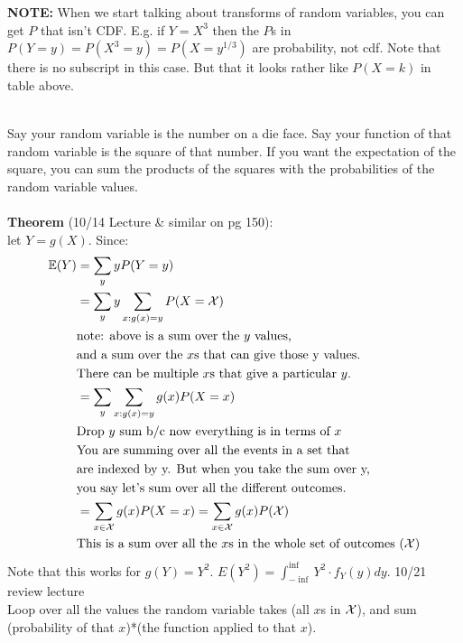 \textbf{NOTE:}  When we start talking about transforms of random variables, you can get $P$ that isn't CDF.  E.g. if $Y = X^3$ then the $P$s in $P(Y = y) = P(X^3 = y) = P(X = y^{1/3}) $ are probability, not cdf.  Note that there is no subscript in this case.  But that it looks rather like $P(X=k)$ in table above.   %

\hfill \\
Say your random variable is the number on a die face.  Say your function of that random variable is the square of that number.  If you want the expectation of the square, you can sum the products of the squares with the probabilities of the random variable values.  \hfill \\
\hfill \\
\textbf{Theorem} {\tiny (10/14 Lecture \& similar on pg 150)}:  \hfill \\
let $Y = g(X)$.  Since:
	\begin{align*}
		\mathbb{E} (Y) &=  \sum\limits_{y} yP(Y=y)   \\
			& = \sum\limits_{y} y \sum\limits_{x:g(x)=y} P(X = {\cal X})  \\
			& \mbox{note: above is a sum over the $y$ values,} \\ 
			& \mbox{and a sum over the $x$s that can give those y values.} \\
			& \mbox{There can be multiple $x$s that give a particular $y$.} \\
			& = \sum\limits_{y} \sum\limits_{x:g(x)=y} g(x)P(X=x) \\
			& \mbox{Drop $y$ sum b/c now everything is in terms of $x$} \\
			& \mbox{You are summing over all the events in a set that }   \\
			& \mbox{are indexed by y.  But when you take the sum over y, }  \\
			& \mbox{you say let's sum over all the different outcomes. } \\
			& = \sum\limits_{x \in {\cal X}} g(x)P(X=x) = \sum\limits_{x \in {\cal X}} g(x)P({\cal X}) \\ 
			& \mbox{This is a sum over all the $x$s in the whole set of outcomes (${\cal X}$)} 
	\end{align*} 
Note that this works for $g(Y) = Y^2$.  $E(Y^2) =  \int_{-\inf}^{\inf} Y^2 \cdot f_Y(y)dy  $.  {\tiny 10/21 review lecture}  \hfill \\
Loop over all the values the random variable takes (all $x$s in ${\cal X}$), and sum (probability of that $x$)*(the function applied to that $x$).  \hfill \\
 \hfill \\
 
